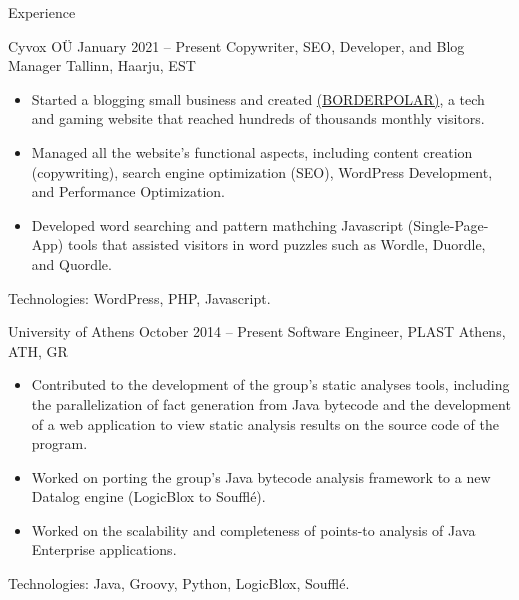 \documentclass{resume}
\begin{document}
\newcommand{\mytilde}{\raise.17ex\hbox{$\scriptstyle\mathtt{\sim}$}}
\newcommand{\indentitem}{\setlength\itemindent{25pt}}


\begin{rSection}{Experience}

  \begin{rSubsection}
    {Cyvox OÜ}
    {January 2021 -- Present}
    {Copywriter, SEO, Developer, and Blog Manager}
    {Tallinn, Haarju, EST}
    \begin{itemize}
      \item Started a blogging small business and created \href{http://borderpolar.com}{(BORDERPOLAR)}, a tech and gaming website that reached hundreds of thousands monthly visitors.
      \item Managed all the website's functional aspects, including content creation (copywriting), search engine optimization (SEO), WordPress Development, and Performance Optimization.
      \item Developed word searching and pattern mathching Javascript (Single-Page-App) tools that assisted visitors in word puzzles such as Wordle, Duordle, and Quordle.
    \end{itemize}  
  \footnotesize\textcolor{MyColor}{Technologies: WordPress, PHP, Javascript.}
  \end{rSubsection}

\begin{rSubsection}
  {University of Athens}
  {October 2014 -- Present}
  {Software Engineer, PLAST}
  {Athens, ATH, GR}
  \begin{itemize}
    \item Contributed to the development of the group's static analyses tools, including the parallelization of fact generation from Java bytecode and the development of a web application to view static analysis results on the source code of the program.
    \item Worked on porting the group's Java bytecode analysis framework to a new Datalog engine (LogicBlox to Soufflé).
    \item Worked on the scalability and completeness of points-to analysis of Java Enterprise applications.
  \end{itemize}  
\footnotesize\textcolor{MyColor}{Technologies: Java, Groovy, Python, LogicBlox, Soufflé.}
\end{rSubsection}


\end{rSection}
\end{document}

